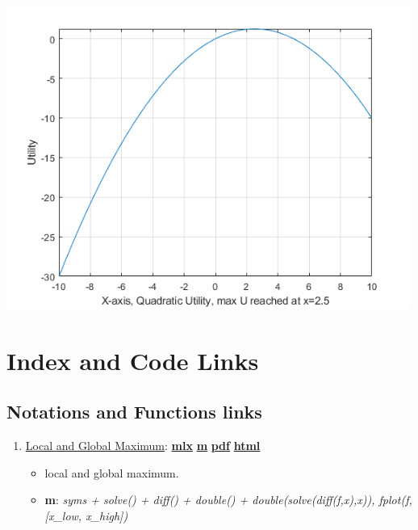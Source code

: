 \documentclass[
]{book}
\providecommand{\tightlist}{%
  \setlength{\itemsep}{0pt}\setlength{\parskip}{0pt}}
\begin{document}
\includegraphics[width=5.20833in,height=\textheight]{img/localglobal_images/figure_0.png}

\hypertarget{appendix-appendix}{%
\appendix}


\hypertarget{index-and-code-links}{%
\chapter{Index and Code Links}\label{index-and-code-links}}

\hypertarget{notations-and-functions-links}{%
\section{Notations and Functions links}\label{notations-and-functions-links}}

\begin{enumerate}
\def\labelenumi{\arabic{enumi}.}
\tightlist
\item
  \href{https://Math4Econ.github.io/calconevar/htmlpdfm/localglobal.html}{Local and Global Maximum}: \href{https://github.com/Math4Econ/Math4Econ.github.io/blob/main/calconevar/localglobal.mlx}{\textbf{mlx}} \textbar{} \href{https://github.com/Math4Econ/Math4Econ.github.io/blob/main/calconevar/htmlpdfm/localglobal.m}{\textbf{m}} \textbar{} \href{https://github.com/Math4Econ/Math4Econ.github.io/blob/main/calconevar/htmlpdfm/localglobal.pdf}{\textbf{pdf}} \textbar{} \href{https://Math4Econ.github.io/calconevar/htmlpdfm/localglobal.html}{\textbf{html}}

  \begin{itemize}
  \tightlist
  \item
    local and global maximum.
  \item
    \textbf{m}: \emph{syms + solve() + diff() + double() + double(solve(diff(f,x),x)), fplot(f,{[}x\_low, x\_high{]})}
  \end{itemize}
\end{enumerate}

  
\end{document}
